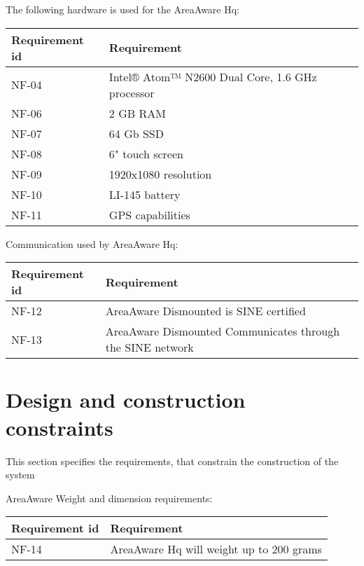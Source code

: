 The following hardware is used for the AreaAware Hq:
\begin{longtable}{| p{3.2cm} |  p{10cm} | }
	\hline
	\textbf{Requirement id} &  \textbf{Requirement } \\
	\hline
	NF-04 & Intel® Atom™ N2600 Dual Core, 1.6 GHz processor  \\
	\hline
	NF-06 & 2 GB RAM  \\
	\hline
	NF-07 & 64 Gb SSD \\
	\hline
	NF-08 & 6" touch screen  \\
	\hline
	NF-09 & 1920x1080 resolution \\
	\hline
	NF-10 &LI-145 battery \\
	\hline
	NF-11 & GPS capabilities \\
	\hline
\end{longtable}

Communication used by AreaAware Hq:
\begin{longtable}{| p{3.2cm} |  p{10cm} | }
	\hline
	\textbf{Requirement id} &  \textbf{Requirement } \\
	\hline
	NF-12 & AreaAware Dismounted is SINE certified  \\
	\hline
	NF-13 & AreaAware Dismounted Communicates through the SINE network \\
	\hline
\end{longtable}





\section{Design and construction constraints}
This section specifies the requirements, that constrain the construction of the system

AreaAware Weight and dimension requirements:
\begin{longtable}{| p{3.2cm} |  p{10cm} | }
	\hline
	\textbf{Requirement id} &  \textbf{Requirement } \\
	\hline
	NF-14 & AreaAware Hq will weight up to 200 grams  \\
	\hline
\end{longtable}


